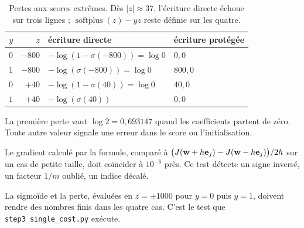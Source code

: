 \begin{table}[htbp]
\centering
\begin{tabular}{rrll}
\toprule
$y$ & $z$ & écriture directe & écriture protégée \\
\midrule
$0$ & $-800$ & $-\log(1-\sigma(-800))=\log 0$ & $0{,}0$ \\
$1$ & $-800$ & $-\log(\sigma(-800))=\log 0$   & $800{,}0$ \\
$0$ & $+40$  & $-\log(1-\sigma(40))=\log 0$   & $40{,}0$ \\
$1$ & $+40$  & $-\log(\sigma(40))$            & $0{,}0$ \\
\bottomrule
\end{tabular}
\caption{Pertes aux scores extrêmes. Dès $|z|\approx37$, l'écriture directe
échoue sur trois lignes ; $\operatorname{softplus}(z)-yz$ reste définie sur les
quatre.}
\label{tab:stabilite}
\end{table}

\begin{vigilance}
La première perte vaut $\log 2=0{,}693147$ quand les coefficients partent de
zéro. Toute autre valeur signale une erreur dans le score ou l'initialisation.

Le gradient calculé par la formule, comparé à
$\bigl(J(\mathbf{w}+h\mathbf e_j)-J(\mathbf{w}-h\mathbf e_j)\bigr)/2h$ sur un cas de petite
taille, doit coïncider à $10^{-6}$ près. Ce test détecte un signe inversé, un
facteur $1/m$ oublié, un indice décalé.

La sigmoïde et la perte, évaluées en $z=\pm1000$ pour $y=0$ puis $y=1$, doivent
rendre des nombres finis dans les quatre cas. C'est le test que
\texttt{step3\_single\_cost.py} exécute.
\end{vigilance}
